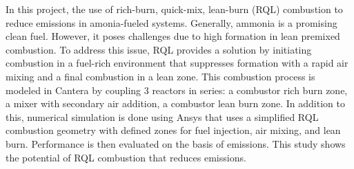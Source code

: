 In this project, the use of rich-burn, quick-mix, lean-burn (RQL) combustion to reduce  emissions in amonia-fueled systems. Generally, ammonia is a promising clean fuel. However, it poses challenges due to high  formation in lean premixed combustion. To address this issue, RQL provides a solution by initiating combustion in a fuel-rich environment that suppresses  formation with a rapid air mixing and a final combustion in a lean zone. This combustion process is modeled in Cantera by coupling 3 reactors in series: a combustor rich burn zone, a mixer with secondary air addition, a combustor lean burn zone. In addition to this, numerical simulation is done using Ansys that uses a simplified RQL combustion geometry with defined zones for fuel injection, air mixing, and lean burn. Performance is then evaluated on the basis of emissions. This study shows the potential of RQL combustion that reduces  emissions.